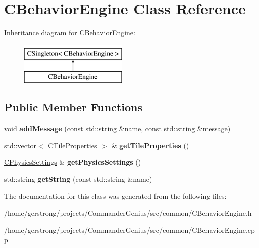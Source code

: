 \hypertarget{class_c_behavior_engine}{
\section{CBehaviorEngine Class Reference}
\label{class_c_behavior_engine}
}
Inheritance diagram for CBehaviorEngine:\begin{figure}[H]
\begin{center}
\leavevmode
\includegraphics[height=2cm]{class_c_behavior_engine}
\end{center}
\end{figure}
\subsection*{Public Member Functions}
\begin{DoxyCompactItemize}
\item 
\hypertarget{class_c_behavior_engine_a01a2306af2aa8d64729926d20809b75a}{
void {\bfseries addMessage} (const std::string \&name, const std::string \&message)}
\label{class_c_behavior_engine_a01a2306af2aa8d64729926d20809b75a}

\item 
\hypertarget{class_c_behavior_engine_a0d5263d6fc1eab59d7ed03b0807f090f}{
std::vector$<$ \hyperlink{class_c_tile_properties}{CTileProperties} $>$ \& {\bfseries getTileProperties} ()}
\label{class_c_behavior_engine_a0d5263d6fc1eab59d7ed03b0807f090f}

\item 
\hypertarget{class_c_behavior_engine_ac9d9e812c2a5e923d8c9813dbd0c414d}{
\hyperlink{class_c_physics_settings}{CPhysicsSettings} \& {\bfseries getPhysicsSettings} ()}
\label{class_c_behavior_engine_ac9d9e812c2a5e923d8c9813dbd0c414d}

\item 
\hypertarget{class_c_behavior_engine_a65df2c0504183811afbbe2e4f3dd92e7}{
std::string {\bfseries getString} (const std::string \&name)}
\label{class_c_behavior_engine_a65df2c0504183811afbbe2e4f3dd92e7}

\end{DoxyCompactItemize}


The documentation for this class was generated from the following files:\begin{DoxyCompactItemize}
\item 
/home/gerstrong/projects/CommanderGenius/src/common/CBehaviorEngine.h\item 
/home/gerstrong/projects/CommanderGenius/src/common/CBehaviorEngine.cpp\end{DoxyCompactItemize}
